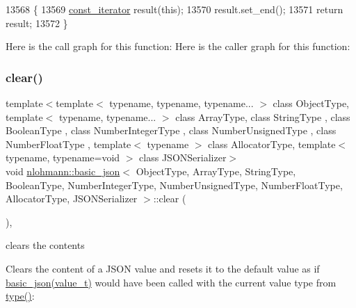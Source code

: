 \begin{DoxyCode}
13568     \{
13569         \hyperlink{classnlohmann_1_1basic__json_a41a70cf9993951836d129bb1c2b3126a}{const\_iterator} result(\textcolor{keyword}{this});
13570         result.set\_end();
13571         \textcolor{keywordflow}{return} result;
13572     \}
\end{DoxyCode}
Here is the call graph for this function\+:
Here is the caller graph for this function\+:
\mbox{\label{classnlohmann_1_1basic__json_abfeba47810ca72f2176419942c4e1952}} 
\subsubsection{\texorpdfstring{clear()}{clear()}}
{\footnotesize\ttfamily template$<$template$<$ typename, typename, typename... $>$ class Object\+Type, template$<$ typename, typename... $>$ class Array\+Type, class String\+Type , class Boolean\+Type , class Number\+Integer\+Type , class Number\+Unsigned\+Type , class Number\+Float\+Type , template$<$ typename $>$ class Allocator\+Type, template$<$ typename, typename=void $>$ class J\+S\+O\+N\+Serializer$>$ \\
void \hyperlink{classnlohmann_1_1basic__json}{nlohmann\+::basic\+\_\+json}$<$ Object\+Type, Array\+Type, String\+Type, Boolean\+Type, Number\+Integer\+Type, Number\+Unsigned\+Type, Number\+Float\+Type, Allocator\+Type, J\+S\+O\+N\+Serializer $>$\+::clear (\begin{DoxyParamCaption}{ }\end{DoxyParamCaption})\hspace{0.3cm}{\ttfamily [inline]}, {\ttfamily [noexcept]}}



clears the contents 

Clears the content of a J\+S\+ON value and resets it to the default value as if \hyperlink{classnlohmann_1_1basic__json_aed115142bd0c6c66c864700e0467df55}{basic\+\_\+json(value\+\_\+t)} would have been called with the current value type from \hyperlink{classnlohmann_1_1basic__json_a2b2d781d7f2a4ee41bc0016e931cadf7}{type()}\+:

